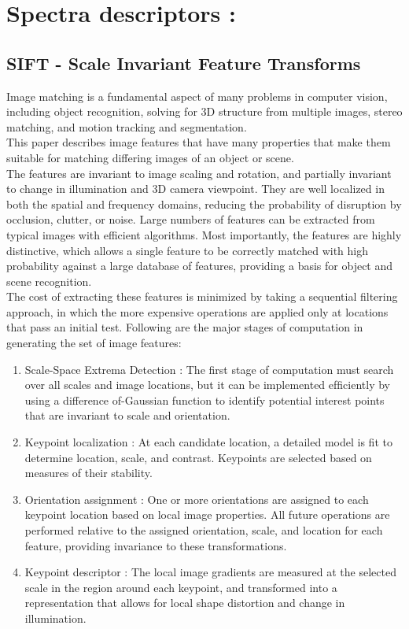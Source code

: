 \section{Spectra descriptors :}
\subsection{SIFT - Scale Invariant Feature Transforms} \label{siftSection}

Image matching is a fundamental aspect of many problems in computer vision, including
object recognition, solving for 3D structure from multiple images, stereo matching, and
motion tracking and segmentation.\\ This paper describes image features that have many
properties that make them suitable for matching differing images of an object or scene.\\
The features are invariant to image scaling and rotation, and partially invariant to change
in illumination and 3D camera viewpoint. They are well localized in both the spatial and
frequency domains, reducing the probability of disruption by occlusion, clutter, or noise.
Large numbers of features can be extracted from typical images with efficient algorithms.
Most importantly, the features are highly distinctive, which allows a single feature to be
correctly matched with high probability against a large database of features, providing a
basis for object and scene recognition.\\
The cost of extracting these features is minimized by taking a sequential filtering approach,
in which the more expensive operations are applied only at locations that pass an
initial test. Following are the major stages of computation in generating the set of image
features:


\begin{enumerate}
\item Scale-Space Extrema Detection :
The ﬁrst stage of computation must search over all
scales and image locations, but it can be implemented efﬁciently by using a difference of-Gaussian
function to identify potential interest points that are invariant to scale and
orientation.
\item Keypoint localization :
At each candidate location, a detailed model is ﬁt to determine
location, scale, and contrast. Keypoints are selected based on measures of their
stability.
\item Orientation assignment :
One or more orientations are assigned to each keypoint
location based on local image properties. All future operations are performed relative
to the assigned orientation, scale, and location for each feature, providing invariance
to these transformations.
\item Keypoint descriptor  :
The local image gradients are measured at the selected scale
in the region around each keypoint, and transformed into a representation that allows
for local shape distortion and change in illumination.
\end{enumerate}

